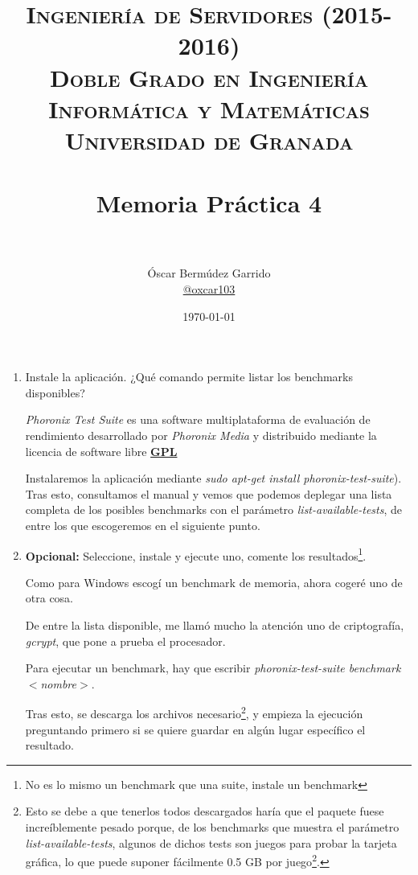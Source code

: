 \documentclass[paper=a4, fontsize=11pt]{scrartcl} %
\title{	
\normalfont \normalsize 
\textsc{{\bf Ingeniería de Servidores (2015-2016)} \\ Doble Grado en Ingeniería Informática y Matemáticas \\ Universidad de Granada} \\ [25pt] %
\horrule{0.5pt} \\[0.4cm] %
\huge Memoria Práctica 4 \\ %
\horrule{2pt} \\[0.5cm] %
}
\author{Óscar Bermúdez Garrido\\ \href{http://www.github.com/oxcar103}{@oxcar103}} %
\date{\normalsize\today} %
\numberwithin{equation}{section} %
\numberwithin{figure}{section} %
\numberwithin{table}{section} %
\begin{document}
\maketitle %
\newpage %
\tableofcontents %
\listoffigures

\newpage

\begin{enumerate}
	\section{Benchmarks populares}
	\subsection{Phoronix Suite}
		\item Instale la aplicación. ¿Qué comando permite listar los benchmarks disponibles?
		
		\textit{Phoronix Test Suite} es una software multiplataforma de evaluación de rendimiento
		desarrollado por \textit{Phoronix Media}\cite{phoronix_official} y distribuido mediante la 
		licencia de software libre \href{https://www.gnu.org/licenses/gpl.html}{\textbf{GPL}}
		
		Instalaremos la aplicación mediante \textit{sudo apt-get install phoronix-test-suite}). Tras
		esto, consultamos el manual \cite{man_phoronix} y vemos que podemos deplegar una lista completa
		de los posibles benchmarks con el parámetro \textit{list-available-tests}, de entre los que
		escogeremos en el siguiente punto.
		
		\item \textbf{Opcional:} Seleccione, instale y ejecute uno, comente los resultados\footnote{No
		es lo mismo un benchmark que una suite, instale un benchmark}.
		
		Como para Windows escogí un benchmark de memoria, ahora cogeré uno de otra cosa.
		
		De entre la lista disponible, me llamó mucho la atención uno de criptografía, \textit{gcrypt},
		que pone a prueba el procesador.
		
		Para ejecutar un benchmark, hay que escribir \textit{phoronix-test-suite benchmark $<$nombre$>$}.
		
		Tras esto, se descarga los archivos necesario\footnote{Esto se debe a que tenerlos todos
		descargados haría que el paquete fuese increíblemente pesado porque, de los benchmarks que
		muestra el parámetro \textit{list-available-tests}, algunos de dichos tests son juegos para
		probar la tarjeta gráfica, lo que puede suponer fácilmente 0.5 GB por juego\footnote{Nótese
		además que hay otro comando disponible llamado \textit{list-available-suites} que permite ver
		algunos bancos de pruebas, con lo cuál, el peso sería aún mayor.}.}, y empieza la ejecución
		preguntando primero si se quiere guardar en algún lugar específico el resultado.
		

\end{enumerate}
\end{document}
